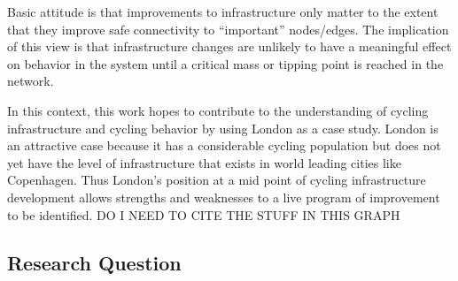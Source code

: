 Basic attitude is that improvements to infrastructure only matter to the extent that they improve safe connectivity to ``important'' nodes/edges.  The implication of this view is that infrastructure changes are unlikely to have a meaningful effect on behavior in the system until a critical mass or tipping point is reached in the network. 

In this context, this work hopes to contribute to the understanding of cycling infrastructure and cycling behavior by using London as a case study. London is an attractive case because it has a considerable cycling population but does not yet have the level of infrastructure that exists in world leading cities like Copenhagen. Thus London's position at a mid point of cycling infrastructure development allows strengths and weaknesses to a live program of improvement to be identified. DO I NEED TO CITE THE STUFF IN THIS GRAPH


\subsection{Research Question}
%


